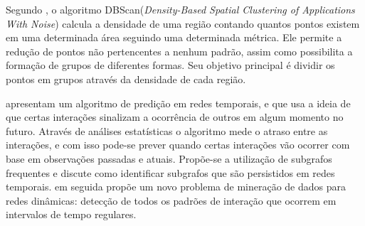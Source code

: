 Segundo \cite{density-based-clusters}, o algoritmo DBScan(\textit{Density-Based Spatial Clustering
of Applications With Noise}) calcula a densidade de uma região contando quantos pontos existem
em uma determinada área seguindo uma determinada métrica. Ele permite a redução de pontos não
pertencentes a nenhum padrão, assim como possibilita a formação de grupos de diferentes formas.
Seu objetivo principal é dividir os pontos em grupos através da densidade de cada região.

\cite{lahiri2007} apresentam um algoritmo de predição em redes temporais, e que usa a ideia de que certas
interações sinalizam a ocorrência de outros em algum momento no futuro. Através de análises estatísticas
o algoritmo mede o atraso entre as interações, e com isso pode-se prever quando certas interações vão ocorrer
com base em observações passadas e atuais. Propõe-se a utilização de subgrafos frequentes e discute
como identificar subgrafos que são persistidos em redes temporais.
\cite{lahiri2008} em seguida propõe um novo problema de mineração de dados para redes dinâmicas:
detecção de todos os padrões de interação que ocorrem em intervalos de tempo regulares.











